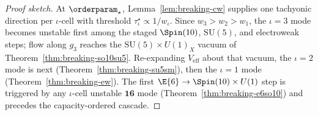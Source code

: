 \begin{proof}[Proof sketch]
At $\orderparam_\star$, Lemma~\ref{lem:breaking-cw} supplies one tachyonic
direction per $\iota$-cell with threshold $\tau_\iota^\star\propto 1/w_\iota$.
Since $w_3>w_2>w_1$, the $\iota=3$ mode becomes unstable first among the staged
$\Spin(10)$, $\mathrm{SU}(5)$, and electroweak steps; flow along $g_3$ reaches
the $\mathrm{SU}(5)\times U(1)_X$ vacuum of Theorem~\ref{thm:breaking-so10su5}.
Re-expanding $V_{\mathrm{eff}}$ about that vacuum, the $\iota=2$ mode is next
(Theorem~\ref{thm:breaking-su5sm}), then the $\iota=1$ mode
(Theorem~\ref{thm:breaking-ew}). The first $\E{6}\to\Spin(10)\times U(1)$ step
is triggered by any $\iota$-cell unstable $\mathbf{16}$ mode
(Theorem~\ref{thm:breaking-e6so10}) and precedes the capacity-ordered cascade.
\end{proof}

